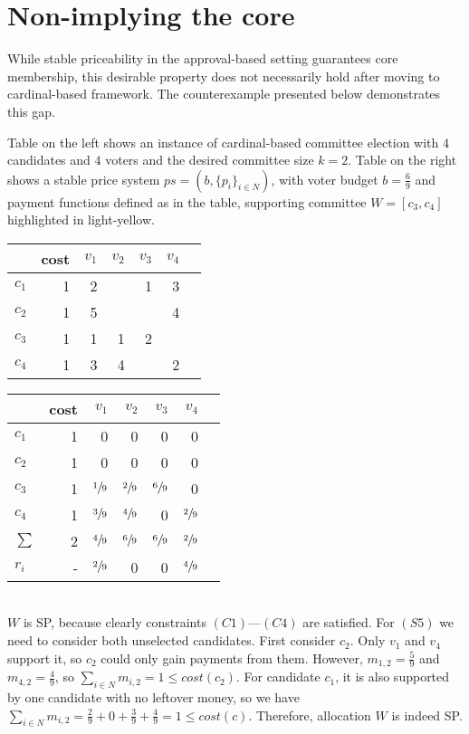 \section{Non-implying the core}
While stable priceability in the approval-based setting guarantees core membership, this desirable property does not necessarily hold after moving to cardinal-based framework. The counterexample presented below demonstrates this gap.
\begin{counterexample} Table on the left shows an instance of cardinal-based committee election with $4$ candidates and $4$ voters and the desired committee size $k=2$. Table on the right shows a stable price system $ps=(b, \{p_i\}_{i\in N})$, with voter budget $b=\frac{6}{9}$ and payment functions defined as in the table, supporting committee $W=[c_3,c_4]$ highlighted in light-yellow.
\leavevmode\\
\begin{minipage}{0.45\textwidth}
\centering
\begin{tabular}{lrrrrrr}
\toprule
        & cost  & $v_1$ & $v_2$ & $v_3$ & $v_4$  \\
\midrule
$c_1$ & 1  & 2 &   & 1 & 3   \\
$c_2$ & 1  & 5 &   &   & 4\\
$c_3$ & 1  & 1 & 1 & 2 &  \\
$c_4$ & 1  & 3 & 4 &   & 2    \\
\bottomrule
\end{tabular}
\end{minipage}%
\hfill
\begin{minipage}{0.45\textwidth}
\centering
\begin{tabular}{lrrrrrr}
\toprule
        & cost & $v_1$ & $v_2$ & $v_3$ & $v_4$  \\
\midrule
$c_1$ & 1 & 0 & 0 & 0 & 0    \\
$c_2$ & 1 & 0 & 0 & 0 & 0 \\
\rowcolor{yellow!10}
$c_3$ & 1 & $\sfrac{1}{9}$ & $\sfrac{2}{9}$ & $\sfrac{6}{9}$ & 0\\
\rowcolor{yellow!10}
$c_4$ & 1 & $\sfrac{3}{9}$ & $\sfrac{4}{9}$ & 0 & $\sfrac{2}{9}$\\
\rowcolor{yellow!30}
$\sum$ & 2 & $\sfrac{4}{9}$ & $\sfrac{6}{9}$ & $\sfrac{6}{9}$ & $\sfrac{2}{9}$ \\
$r_i$ & - & $\sfrac{2}{9}$ & 0 & 0 & $\sfrac{4}{9}$ \\
\bottomrule
\end{tabular}
\end{minipage}%
\vspace{0.5em}
\leavevmode\\ 
$W$ is SP, because clearly constraints $(C1)$---$(C4)$ are satisfied. For $(S5)$ we need to consider both unselected candidates. First consider $c_2$. Only $v_1$ and $v_4$ support it, so $c_2$ could only gain payments from them. However, $m_{1,2}=\frac{5}{9}$ and $m_{4,2}=\frac{4}{9}$, so $\sum_{i\in N}m_{i,2}=1\le cost(c_2)$. For candidate $c_1$, it is also supported by one candidate with no leftover money, so we have $\sum_{i \in N}m_{i,2}=\frac{2}{9} + 0 +\frac{3}{9} + \frac{4}{9} = 1 \le cost(c)$. Therefore, allocation $W$ is indeed SP.


\end{counterexample}
